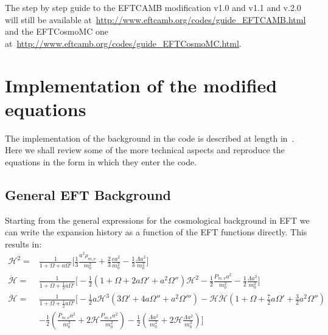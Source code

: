 \documentclass[prd,nofootinbib,showpacs]{revtex4}
\def\hub{{\mathcal H}}
\begin{document}
{The step by step guide to the EFTCAMB modification v1.0 and v1.1 and v.2.0 will still be available at~\url{http://www.eftcamb.org/codes/guide_EFTCAMB.html} and the  EFTCosmoMC one at~\url{http://www.eftcamb.org/codes/guide_EFTCosmoMC.html}.

\section{Implementation of the modified equations}\label{Sec:ModEquations}
The implementation of the background in the code is described at length in~\cite{Hu:2013twa}. Here we shall review some of the more technical aspects and reproduce the equations in the form in which they enter the code. 

\subsection{General EFT Background} \label{SubSec:FullEFTBackground}
%
Starting from the general expressions for the cosmological background in EFT we can write the expansion history as a function of the EFT functions directly.
This results in:
%
\begin{align}
\hub^2 =& \frac{1}{1+\Omega +a\Omega'} \bigg[ \frac{1}{3} \frac{a^2\rho_{m,\nu}}{m_0^2} +\frac{2}{3}\frac{ca^2}{m_0^2}  -\frac{1}{3} \frac{\Lambda a^2}{m_0^2}\bigg] \nonumber \\
\dot{\hub} =& \frac{1}{1+\Omega+\frac{1}{2}a\Omega'} \bigg[ -\frac{1}{2}\left( 1+\Omega+2a\Omega' +a^2\Omega'' \right)\hub^2 -\frac{1}{2}\frac{P_{m,\nu}a^2}{m_0^2} -\frac{1}{2}\frac{\Lambda a^2}{m_0^2} \bigg] \nonumber \\
\ddot{\hub} =& \frac{1}{1+\Omega +\frac{1}{2}a\Omega' } \bigg[ -\frac{1}{2}a\hub^3\left( 3\Omega' +4a\Omega'' +a^2\Omega'''\right) -\hub\dot{\hub}\left( 1+\Omega +\frac{7}{2}a\Omega' +\frac{3}{2}a^2\Omega'' \right) \nonumber \\
&-\frac{1}{2}\left( \frac{\dot{P}_{m,\nu}a^2}{m_0^2} +2\hub \frac{P_{m,\nu}a^2}{m_0^2}\right) -\frac{1}{2}\left( \frac{\dot{\Lambda}a^2}{m_0^2} +2\hub \frac{\Lambda a^2}{m_0^2}\right) \bigg]
\end{align}
%

}
\end{document}
